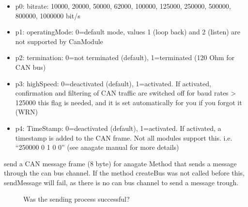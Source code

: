 \documentclass[a4paper,10pt,english]{sphinxmanual}
\begin{document}
\begin{fulllineitems}
\begin{fulllineitems}
\begin{description}
\begin{itemize}
\begin{itemize}
\item {} 
p0: bitrate: 10000, 20000, 50000, 62000, 100000, 125000, 250000, 500000, 800000, 1000000 bit/s

\item {} 
p1: operatingMode: 0=default mode, values 1 (loop back) and 2 (listen) are not supported by CanModule

\item {} 
p2: termination: 0=not terminated (default), 1=terminated (120 Ohm for CAN bus)

\item {} 
p3: highSpeed: 0=deactivated (default), 1=activated. If activated, confirmation and filtering of CAN traffic are switched off for baud rates \textgreater{} 125000 this flag is needed, and it is set automatically for you if you forgot it (WRN)

\item {} 
p4: TimeStamp: 0=deactivated (default), 1=activated. If activated, a timestamp is added to the CAN frame. Not all modules support this. i.e. “250000 0 1 0 0” (see anagate manual for more details)

\end{itemize}


\end{itemize}

\end{description}


\end{fulllineitems}


\begin{fulllineitems}
\label{\detokenize{vendors/anagate:_CPPv4N10AnaCanScan11sendMessageEshPhb}}%
\pysigstartmultiline
{}%
\pysigstopmultiline
send a CAN message frame (8 byte) for anagate Method that sends a message through the can bus channel. If the method createBus was not called before this, sendMessage will fail, as there is no can bus channel to send a message trough. \begin{description}
\item[{}] \leavevmode
Was the sending process successful? 


\end{description}
\end{fulllineitems}
\end{fulllineitems}
\end{document}
